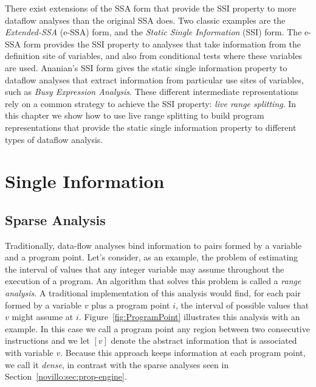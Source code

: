 There exist extensions of the SSA form that provide the SSI property to more
dataflow analyses than the original SSA does.
Two classic examples are the {\em Extended-SSA} (e-SSA) form, and the {\em Static Single Information} (SSI) form.
The e-SSA form provides the SSI property to analyses that take information from
the definition site of variables, and also from conditional tests where these
variables are used.
Ananian's SSI form gives the static single information property to dataflow
analyses that extract information from particular use sites of variables, such
as {\em Busy Expression Analysis}.
These different intermediate representations rely on a common strategy to achieve the SSI property: {\em live range splitting}.
In this chapter we show how to use live range splitting to build program
representations that provide the static single information property to different
types of dataflow analysis.

\section{Single Information}
\label{sec:ssi:pereira:single}



\subsection{Sparse Analysis}
\label{sec:ssi:pereira:sparse}

Traditionally, data-flow analyses bind information to pairs formed by a variable and a program point.
Let's consider, as an example, the problem of estimating the interval of values that any integer variable may assume throughout the execution of a program.
An algorithm that solves this problem is called a {\em range analysis}.
A traditional implementation of this analysis would find, for each pair formed by a variable $v$ plus a program point $i$, the interval of possible values that $v$ might assume at $i$.
Figure~\ref{fig:ProgramPoint} illustrates this analysis with an example.
In this case we call a program point any region between two consecutive
instructions and we let $[v]$ denote the abstract information that is associated
with variable $v$.
Because this approach keeps information at each program point, we call it {\em dense}, in contrast with the sparse analyses seen in Section~\ref{novillo:sec:prop-engine}.

